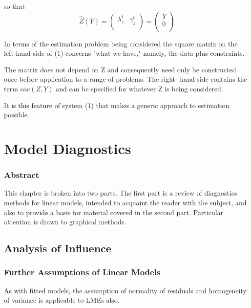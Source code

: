 \documentclass[12pt, a4paper]{article}
\begin{document}
so that
\[ \hat{Z}(Y) =
\left(
  \begin{array}{cc}
    \lambda_{z}^{t}&
   \gamma_z^{t} \\
  \end{array}
\right)=\left(
  \begin{array}{c}
    Y \\
    0 \\
  \end{array}
\right) \]

In terms of the estimation problem being considered the square matrix on the left-hand side of (1) concerns "what we have," namely, the data plus constraints.

The matrix does not depend on Z and consequently need only be constructed once before application to a range of problems. The right- hand side contains the term $cov(Z,Y)$ and can be specified for whatever Z is being considered.

It is this feature of system (1) that makes a generic approach to estimation possible.

\chapter{Model Diagnostics}

\subsection*{Abstract}
This chapter is broken into two parts. The first part is a review of diagnostics methods for linear models, intended to acquaint the reader with the subject, and also to provide a basis for material covered in the second part. Particular attention is drawn to graphical methods.



\section{Analysis of  Influence}



\subsection{Further Assumptions of Linear Models}

As with fitted models, the assumption of normality of residuals and homogeneity of variance is applicable to LMEs also. 
\end{document}

